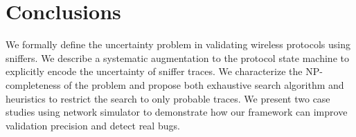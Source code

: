 \section{Conclusions}
\label{sec:conclusion}

We formally define the uncertainty problem in validating
wireless protocols using sniffers. We describe a systematic augmentation to the
protocol state machine to explicitly encode the uncertainty of sniffer traces.
We characterize the NP-completeness of the problem and propose both exhaustive
search algorithm and heuristics to restrict the search to only probable
traces. We present two case studies using \ns{} network simulator to demonstrate
how our framework can improve validation precision and detect real bugs.

\begin{comment}
Finally, we discuss a few challenges and future
directions.

\textbf{Verification Coverage.} Given a single sniffer trace, it is possible
that not all the states in the state machine are visited during the verification
process. For instance, a rate control state machine based on certain consecutive
packet losses patterns can not be verified if no such consecutive losses appear
in the sniffer trace. In general, given a protocol state machine, how to extract
the packet patterns for each state to be reached and how to alter the testing
such that such patterns can be observed?

\textbf{State Machine Generation.} We manually translated the protocols studied
in this paper into monitor state machines based on the source code, comments and
documentation. The process is time-consuming and error-prone. A more scalable
approach would be taking the protocol specification written in certain formal
language, and automatically translate such specification into state machines
that can be used for verification process.

\end{comment}
